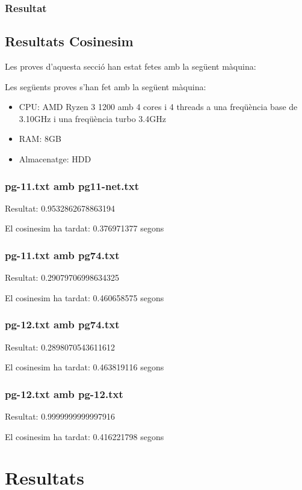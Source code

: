 \documentclass[11pt,a4paper,twoside]{report}
\begin{document}
\subsection{Resultat}
\small{}

\section{Resultats Cosinesim}
Les proves d'aquesta secció han estat fetes amb la següent màquina:

Les següents proves s'han fet amb la següent màquina:
\begin{itemize}
  \item CPU: AMD Ryzen 3 1200 amb 4 cores i 4 threads a una freqüència base de 3.10GHz i una freqüència turbo 3.4GHz
  \item RAM: 8GB
  \item Almacenatge: HDD
\end{itemize}

\subsection{pg-11.txt amb pg11-net.txt}
Resultat: 0.9532862678863194

El cosinesim ha tardat: 0.376971377 segons

\subsection{pg-11.txt amb pg74.txt}
Resultat: 0.29079706998634325

El cosinesim ha tardat: 0.460658575 segons

\subsection{pg-12.txt amb pg74.txt}
Resultat: 0.2898070543611612

El cosinesim ha tardat: 0.463819116 segons

\subsection{pg-12.txt amb pg-12.txt}
Resultat: 0.9999999999997916

El cosinesim ha tardat: 0.416221798 segons





\chapter{Resultats}
\end{document}
